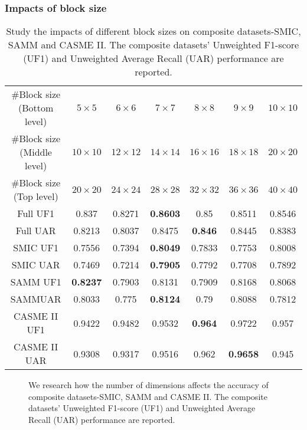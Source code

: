 \documentclass[review,12pt, 3p]{elsarticle}
\begin{document}
\subsubsection{Impacts of block size}
\begin{table*}[t]
\centering
\caption{ Study the impacts of different block sizes on composite datasets-SMIC, SAMM and CASME II. The composite datasets' Unweighted F1-score (UF1) and Unweighted Average Recall (UAR) performance are reported. }
\begin{tabular}{c| c c c c c c    }
\hline
\#Block size (Bottom level) &$5 \times 5$ &$6 \times 6$ &$7 \times 7$ &$8 \times 8$ &$9 \times 9$ & $10 \times 10$ \\
\#Block size (Middle level) &$10 \times 10$ &$12 \times 12$ &$14 \times 14$ &$16 \times 16$ &$18 \times 18$ & $20 \times 20$ \\
\#Block size (Top level) &$20 \times 20$ &$24 \times 24$ &$28 \times 28$ &$32 \times 32$ &$36 \times 36$ & $40 \times 40$ \\
\hline
Full UF1   &0.837 &0.8271  & \textbf{0.8603}   & 0.85 & 0.8511 & 0.8546\\
Full UAR  &0.8213 &0.8037  & 0.8475  & \textbf{0.846}   & 0.8445 & 0.8383 \\
SMIC UF1   &0.7556 &0.7394  & \textbf{0.8049}   & 0.7833 & 0.7753 & 0.8008\\
SMIC UAR  &0.7469 &0.7214  & \textbf{0.7905}  & 0.7792   & 0.7708 & 0.7892 \\
SAMM UF1   &\textbf{0.8237} &0.7903  & 0.8131   & 0.7909 & 0.8168 & 0.8068\\
SAMMUAR  &0.8033 &0.775  & \textbf{0.8124}  & 0.79   & 0.8088 & 0.7812 \\
CASME II UF1   &0.9422 &0.9482  & 0.9532   & \textbf{0.964} & 0.9722 & 0.957\\
CASME II UAR  &0.9308 &0.9317  & 0.9516  & 0.962   & \textbf{0.9658} & 0.945 \\
\hline
\hline
\end{tabular}
 \label{impacts_of_block_size}
\end{table*}

 \begin{figure}[!t]
\centering
{}
\caption{We research how the number of dimensions affects the accuracy of composite datasets-SMIC, SAMM and CASME II. The composite datasets' Unweighted F1-score (UF1) and Unweighted Average Recall (UAR) performance are reported.}
\label{dimension_number}
\end{figure}
\end{document}
